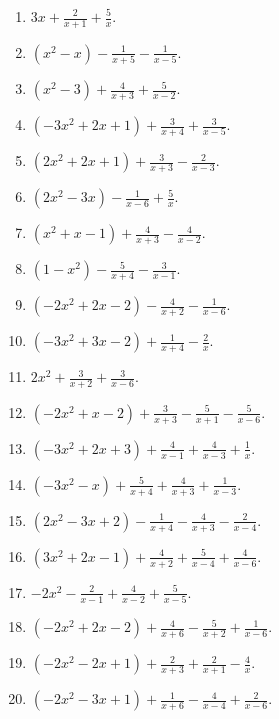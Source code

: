 \documentclass[11pt,oneside]{book}
\begin{document}
\begin{enumerate}[leftmargin=*,label=\textbf{Z\arabic*.},itemsep=0.45\baselineskip]
\item $\displaystyle 3 x + \frac{2}{x + 1} + \frac{5}{x}$.
\item $\displaystyle \left(x^{2} - x\right) - \frac{1}{x + 5} - \frac{1}{x - 5}$.
\item $\displaystyle \left(x^{2} - 3\right) + \frac{4}{x + 3} + \frac{5}{x - 2}$.
\item $\displaystyle \left(- 3 x^{2} + 2 x + 1\right) + \frac{3}{x + 4} + \frac{3}{x - 5}$.
\item $\displaystyle \left(2 x^{2} + 2 x + 1\right) + \frac{3}{x + 3} - \frac{2}{x - 3}$.
\item $\displaystyle \left(2 x^{2} - 3 x\right) - \frac{1}{x - 6} + \frac{5}{x}$.
\item $\displaystyle \left(x^{2} + x - 1\right) + \frac{4}{x + 3} - \frac{4}{x - 2}$.
\item $\displaystyle \left(1 - x^{2}\right) - \frac{5}{x + 4} - \frac{3}{x - 1}$.
\item $\displaystyle \left(- 2 x^{2} + 2 x - 2\right) - \frac{4}{x + 2} - \frac{1}{x - 6}$.
\item $\displaystyle \left(- 3 x^{2} + 3 x - 2\right) + \frac{1}{x + 4} - \frac{2}{x}$.
\item $\displaystyle 2 x^{2} + \frac{3}{x + 2} + \frac{3}{x - 6}$.
\item $\displaystyle \left(- 2 x^{2} + x - 2\right) + \frac{3}{x + 3} - \frac{5}{x + 1} - \frac{5}{x - 6}$.
\item $\displaystyle \left(- 3 x^{2} + 2 x + 3\right) + \frac{4}{x - 1} + \frac{4}{x - 3} + \frac{1}{x}$.
\item $\displaystyle \left(- 3 x^{2} - x\right) + \frac{5}{x + 4} + \frac{4}{x + 3} + \frac{1}{x - 3}$.
\item $\displaystyle \left(2 x^{2} - 3 x + 2\right) - \frac{1}{x + 4} - \frac{4}{x + 3} - \frac{2}{x - 4}$.
\item $\displaystyle \left(3 x^{2} + 2 x - 1\right) + \frac{4}{x + 2} + \frac{5}{x - 4} + \frac{4}{x - 6}$.
\item $\displaystyle - 2 x^{2} - \frac{2}{x - 1} + \frac{4}{x - 2} + \frac{5}{x - 5}$.
\item $\displaystyle \left(- 2 x^{2} + 2 x - 2\right) + \frac{4}{x + 6} - \frac{5}{x + 2} + \frac{1}{x - 6}$.
\item $\displaystyle \left(- 2 x^{2} - 2 x + 1\right) + \frac{2}{x + 3} + \frac{2}{x + 1} - \frac{4}{x}$.
\item $\displaystyle \left(- 2 x^{2} - 3 x + 1\right) + \frac{1}{x + 6} - \frac{4}{x - 4} + \frac{2}{x - 6}$.

\end{enumerate}
\end{document}
